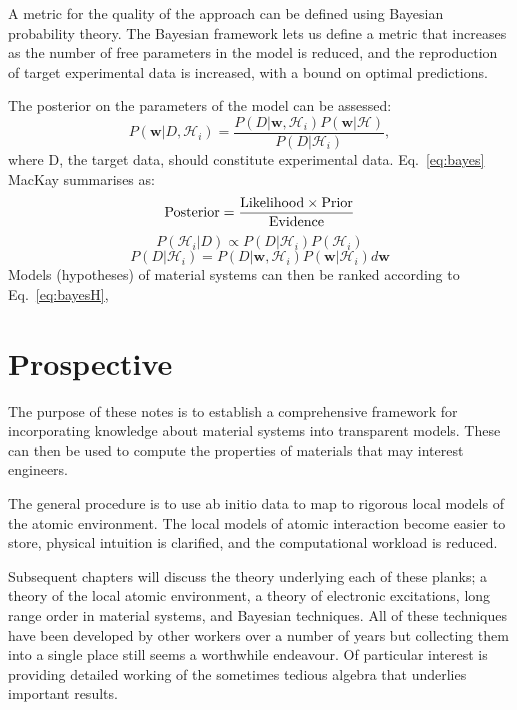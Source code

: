 A metric for the quality of the approach can be defined using 
Bayesian probability theory. The Bayesian framework lets us define a metric 
that increases as the number of free parameters in the model is reduced,
and the reproduction of target experimental data is increased, 
with a bound on optimal predictions.

The posterior on the parameters of the model can be assessed:
%
\begin{equation}
\label{eq:bayes}
P(\mathbf{w}|D, \mathcal{H}_{i}) = 
\frac{P(D|\mathbf{w}, \mathcal{H}_{i})P(\mathbf{w}|\mathcal{H})}{P(D|\mathcal{H}_{i})},
\end{equation}
%
where D, the target data, should constitute experimental data. 
Eq.~\ref{eq:bayes} MacKay summarises as:
%
\begin{equation}
{\rm Posterior} = \frac{{\rm Likelihood} \times {\rm Prior}}{{\rm Evidence}}
\end{equation}
%
\begin{equation}
\label{eq:bayesH}
P(\mathcal{H}_{i}|D) \propto P(D|\mathcal{H}_{i})P(\mathcal{H}_{i})
\end{equation}
%
\begin{equation}
\label{eq:bayesH}
P(D|\mathcal{H}_{i}) = P(D|\mathbf{w}, \mathcal{H}_{i})P(\mathbf{w}|\mathcal{H}_{i})d\mathbf{w}
\end{equation}
%
Models (hypotheses) of material systems can then be ranked according to Eq.~\ref{eq:bayesH},  

\section{Prospective}
The purpose of these notes is to establish a comprehensive framework 
for incorporating knowledge about material systems into transparent models. 
These can then be used to compute the properties of materials that may interest engineers.

The general procedure is to use ab initio data to map 
to rigorous local models of the atomic environment. The local models
of atomic interaction become easier to store, physical intuition is clarified,
and the computational workload is reduced. 

Subsequent chapters will discuss the theory underlying each of these planks; a
theory of the local atomic environment, a theory of electronic excitations, long
range order in material systems, and Bayesian techniques. All of these techniques
have been developed by other workers over a number of years but collecting 
them into a single place still seems a worthwhile endeavour. Of particular interest
is providing detailed working of the sometimes tedious algebra that underlies
important results.

